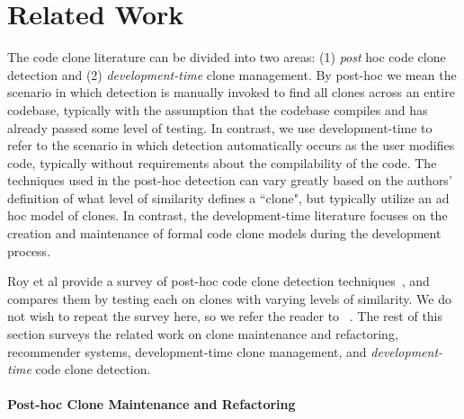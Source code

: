 \documentclass[nocopyrightspace,10pt]{sigplanconf}
\begin{document}

\section{Related Work}
\label{sec:related}

The code clone literature can be divided into two areas: (1)
\emph{post} hoc code clone detection and
(2) \emph{development-time} clone management. By post-hoc we mean the scenario in which
detection is manually invoked to find all clones across an entire codebase, typically with the assumption that the codebase compiles and has already passed some level of testing.  In contrast, we use development-time to refer to the scenario in which detection automatically occurs as the user modifies code, typically without requirements about the compilability of the code.  The techniques used in the
post-hoc detection can vary greatly  based on the authors' definition of what 
level of similarity defines a ``clone", but typically utilize an
ad hoc model of clones. In contrast, the development-time literature focuses on
the creation and maintenance of formal code clone models during the
development process.

Roy et al provide a survey of post-hoc code clone detection
techniques~\cite{Roy2009}, and compares them by testing 
each on clones with varying levels of similarity. We do not wish 
to repeat the survey here, so we refer the reader to ~\cite{Roy2009}.
The rest of this section surveys the
related work on clone maintenance and refactoring, recommender systems,
development-time clone management, and \emph{development-time} code clone detection.

\paragraph{Post-hoc Clone Maintenance and Refactoring}

\end{document}
